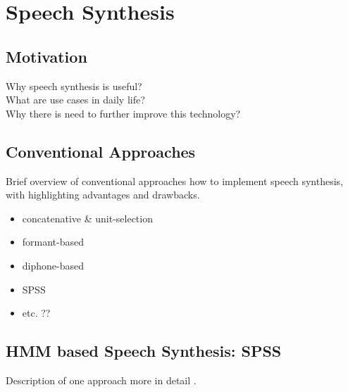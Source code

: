 

\section{Speech Synthesis}
\label{sec:speech}

\subsection{Motivation}

Why speech synthesis is useful?\\What are use cases in daily life?\\Why there is need to further improve this technology?

\subsection{Conventional Approaches}

Brief overview of conventional approaches how to implement speech synthesis, with highlighting advantages and drawbacks.

\begin{itemize}[leftmargin=10pt]
	\item concatenative \& unit-selection
	\item formant-based
	\item diphone-based
	\item \ac{SPSS}
	\item etc. ??
\end{itemize}

\subsection{HMM based Speech Synthesis: \ac{SPSS}}

Description of one approach more in detail \cite{zen:statistical}.

